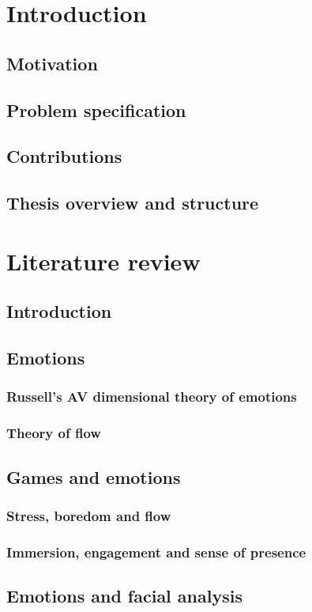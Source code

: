\chapter{Introduction}
  \section{Motivation}
  \section{Problem specification}
  \section{Contributions}
  \section{Thesis overview and structure}

\chapter{Literature review}
  \section{Introduction}
  \section{Emotions}
    \subsection{Russell's AV dimensional theory of emotions}
    \subsection{Theory of flow}
  \section{Games and emotions}
    \subsection{Stress, boredom and flow}
    \subsection{Immersion, engagement and sense of presence}
  \section{Emotions and facial analysis}
